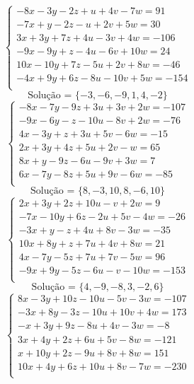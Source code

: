 \documentclass[12pt,oneside,a4paper]{article}
\begin{document}
\begin{equation*}
\begin{cases}
-8x-3y-2z+u+4v-7w=91 \\
-7x+y-2z-u+2v+5w=30 \\
3x+3y+7z+4u-3v+4w=-106 \\
-9x-9y+z-4u-6v+10w=24 \\
10x-10y+7z-5u+2v+8w=-46 \\
-4x+9y+6z-8u-10v+5w=-154 \\
\end{cases}
\end{equation*}
\begin{equation*}
\text{Solução = }\{-3,-6,-9,1,4,-2\}
\end{equation*}
\vspace{\baselineskip}
\begin{equation*}
\begin{cases}
-8x-7y-9z+3u+3v+2w=-107 \\
-9x-6y-z-10u-8v+2w=-76 \\
4x-3y+z+3u+5v-6w=-15 \\
2x+3y+4z+5u+2v-w=65 \\
8x+y-9z-6u-9v+3w=7 \\
6x-7y-8z+5u+9v-6w=-85 \\
\end{cases}
\end{equation*}
\begin{equation*}
\text{Solução = }\{8,-3,10,8,-6,10\}
\end{equation*}
\vspace{\baselineskip}
\begin{equation*}
\begin{cases}
2x+3y+2z+10u-v+2w=9 \\
-7x-10y+6z-2u+5v-4w=-26 \\
-3x+y-z+4u+8v-3w=-35 \\
10x+8y+z+7u+4v+8w=21 \\
4x-7y-5z+7u+7v-5w=96 \\
-9x+9y-5z-6u-v-10w=-153 \\
\end{cases}
\end{equation*}
\begin{equation*}
\text{Solução = }\{4,-9,-8,3,-2,6\}
\end{equation*}
\vspace{\baselineskip}
\begin{equation*}
\begin{cases}
8x-3y+10z-10u-5v-3w=-107 \\
-3x+8y-3z-10u+10v+4w=173 \\
-x+3y+9z-8u+4v-3w=-8 \\
3x+4y+2z+6u+5v-8w=-121 \\
x+10y+2z-9u+8v+8w=151 \\
10x+4y+6z+10u+8v-7w=-230 \\
\end{cases}
\end{equation*}
\end{document}
